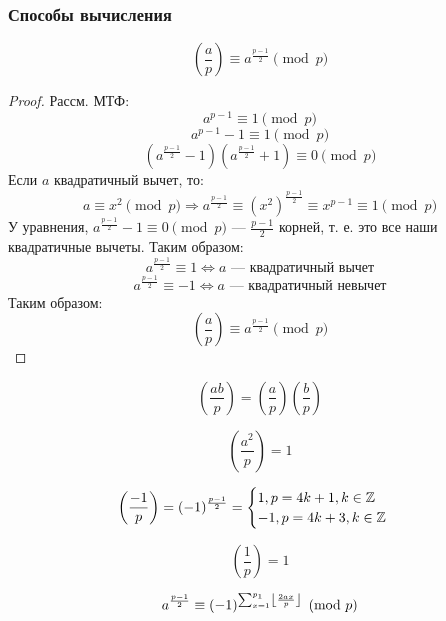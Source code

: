 \subsubsection{Способы вычисления}
\begin{statement}
  \label{statement:01_1}
\[
\left(\frac{a}{p}\right) \equiv a^{\frac{p - 1}{2}} \pmod p
\]
\end{statement}
\begin{proof}
Рассм. МТФ:
\[
a^{p - 1} \equiv 1 \pmod p
\]
\[
a^{p - 1} - 1 \equiv 1 \pmod p
\]
\[
  (a^{\frac{p - 1}{2}} - 1)(a^{\frac{p - 1}{2}} + 1) \equiv 0 \pmod p
\]
Если $a$ квадратичный вычет, то:
\[
a \equiv x^{2} \pmod p \Rightarrow a^{\frac{p - 1}{2}} \equiv (x^{2})^{\frac{p - 1}{2}} \equiv x^{p - 1} \equiv 1 \pmod p
\]
У уравнения, $a^{\frac{p - 1}{2}} - 1 \equiv 0 \pmod p$ --- $\frac{p - 1}{2}$ корней, т. е. это все наши квадратичные вычеты. Таким образом:
\[
a^{\frac{p - 1}{2}} \equiv 1 \iff a \text{ --- квадратичный вычет}
\]
\[
a^{\frac{p - 1}{2}} \equiv -1 \iff a \text{ --- квадратичный невычет}
\]
Таким образом:
\[
\left(\frac{a}{p}\right) \equiv a^{\frac{p - 1}{2}} \pmod p
\]
\end{proof}
\begin{consequence}
  \label{cs:01_1}
\[
\left(\frac{ab}{p}\right) = \left(\frac{a}{p}\right)\left(\frac{b}{p}\right)
\]
\end{consequence}
\begin{consequence}
  \label{cs:01_2}
\[
\left(\frac{a^{2}}{p}\right) = 1
\]
\end{consequence}
\begin{consequence}
  \label{cs:01_3}
\[
\left(\frac{-1}{p}\right) = (-1)^{\frac{p - 1}{2}} = \begin{cases}
1, p = 4k + 1, k \in \mathbb{Z} \\
-1, p = 4k + 3, k \in \mathbb{Z}
\end{cases}
\]
\end{consequence}
\begin{consequence}
  \label{cs:01_4}
\[
\left(\frac{1}{p}\right) = 1
\]
\end{consequence}
\begin{statement}
  \label{statement:01_2}
\[
  a^{\frac{p - 1}{2}} \equiv (-1)^{\sum_{x = 1}^{p_1} \left\lfloor \frac{2ax}{p} \right\rfloor} \pmod p
\]
\end{statement}
